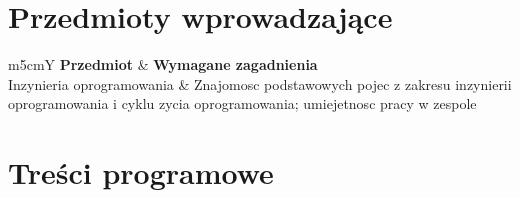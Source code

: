 \documentclass[12pt, a4paper]{article}
\newcommand{\thdrule}{\noalign{\global\setlength{\extrarowheight}{0pt}}}
\newcommand{\thdend}{\noalign{\global\setlength{\extrarowheight}{3pt}}}
\begin{document}
\section{Przedmioty wprowadzające}

{\scriptsize
\begin{tabularx}{\textwidth}{m{5cm}Y}
\thdrule\toprule
{} {\color{white}\textbf{Przedmiot}} & {\color{white}\textbf{Wymagane zagadnienia}} \\
\midrule\thdend
   Inzynieria oprogramowania & Znajomosc podstawowych pojec z zakresu inzynierii oprogramowania i cyklu zycia oprogramowania; umiejetnosc pracy w zespole \\
\bottomrule
\end{tabularx}}

\section{Treści programowe}
\end{document}

